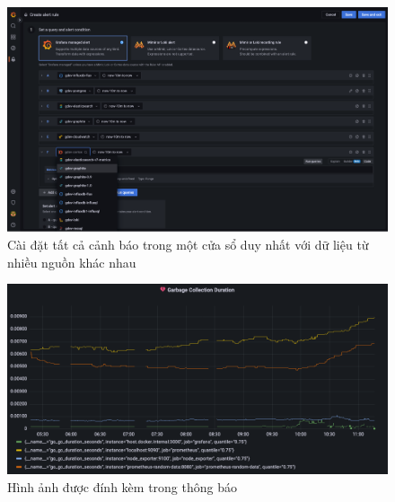 \begin{figure}[H] %
    \centering %
    \includegraphics[width=1\textwidth]{figures/grafana-alerting-multiple-data-sources.png} 
    \caption{Cài đặt tất cả cảnh báo trong một cửa sổ duy nhất với dữ liệu từ nhiều nguồn khác nhau} %
    \label{fig:fig_01}
\end{figure}
\begin{figure}[H] %
    \centering %
    \includegraphics[width=1\textwidth]{figures/grafana-alerting-images-in-notifications.png} 
    \caption{Hình ảnh được đính kèm trong thông báo} %
    \label{fig:fig_01}
\end{figure}
